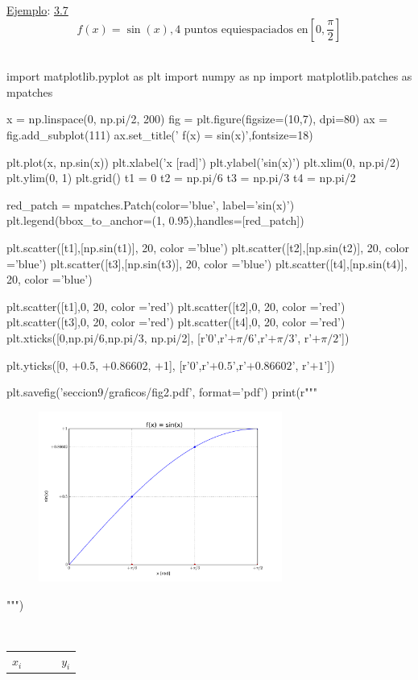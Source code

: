 \underline{Ejemplo}: \underline{3.7}
$$
f(x) = \sin(x), \text{4 puntos equiespaciados en} \left[0, \frac{\pi}{2}\right]
$$
\\
\begin{python}
import matplotlib.pyplot as plt
import numpy as np
import matplotlib.patches as mpatches

x = np.linspace(0, np.pi/2, 200)
fig = plt.figure(figsize=(10,7), dpi=80)
ax = fig.add_subplot(111)
ax.set_title(' f(x) = sin(x)',fontsize=18)

plt.plot(x, np.sin(x))
plt.xlabel('x [rad]')
plt.ylabel('sin(x)')
plt.xlim(0, np.pi/2)
plt.ylim(0, 1)
plt.grid()
t1 = 0
t2 = np.pi/6
t3 = np.pi/3
t4 = np.pi/2

red_patch = mpatches.Patch(color='blue', label='sin(x)')
plt.legend(bbox_to_anchor=(1, 0.95),handles=[red_patch])

plt.scatter([t1],[np.sin(t1)], 20, color ='blue')
plt.scatter([t2],[np.sin(t2)], 20, color ='blue')
plt.scatter([t3],[np.sin(t3)], 20, color ='blue')
plt.scatter([t4],[np.sin(t4)], 20, color ='blue')

plt.scatter([t1],0, 20, color ='red')
plt.scatter([t2],0, 20, color ='red')
plt.scatter([t3],0, 20, color ='red')
plt.scatter([t4],0, 20, color ='red')
plt.xticks([0,np.pi/6,np.pi/3, np.pi/2],
       [r'$0$',r'$+\pi/6$',r'$+\pi/3$', r'$+\pi/2$'])

plt.yticks([0, +0.5, +0.86602, +1],
       [r'$0$',r'$+0.5$',r'$+0.86602$', r'$+1$'])

plt.savefig('seccion9/graficos/fig2.pdf', format='pdf')
print(r"""
\begin{figure}[htbp]
    \centering
    \includegraphics[width=8cm]{seccion9/graficos/fig2.pdf}
    \label{fig:comparison}
\end{figure}
""")
\end{python}
\\
\begin{tabular}{cc}
$x_{i}$ &  \ \ \ \ \ $y_{i} $
\end{tabular}\\

